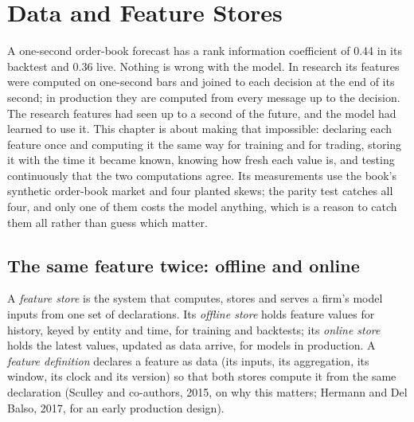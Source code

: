 \chapter{Data and Feature Stores}\label{ch:ml:data-and-feature-stores}

A one-second order-book forecast has a rank information coefficient of 0.44 in its backtest and 0.36 live. Nothing is
wrong with the model. In research its features were computed on one-second bars and joined to each decision at the end of
its second; in production they are computed from every message up to the decision. The research features had seen up to a
second of the future, and the model had learned to use it. This chapter is about making that impossible: declaring each
feature once and computing it the same way for training and for trading, storing it with the time it became known, knowing
how fresh each value is, and testing continuously that the two computations agree. Its measurements use the book's synthetic
order-book market and four planted skews; the parity test catches all four, and only one of them costs the model anything,
which is a reason to catch them all rather than guess which matter.

\section{The same feature twice: offline and online}

\begin{definition}\label{def:ml:data-and-feature-stores:store}
A \emph{feature store} is the system that computes, stores and serves a firm's model inputs from one
set of declarations. Its \emph{offline store} holds feature values for history, keyed by entity and
time, for training and backtests; its \emph{online store} holds the latest values, updated as data
arrive, for models in production. A \emph{feature definition} declares a feature as data (its
inputs, its aggregation, its window, its clock and its version) so that both stores compute it from the same declaration
(Sculley and co-authors, 2015, on why this matters; Hermann and Del Balso, 2017, for an early production design).
\end{definition}


